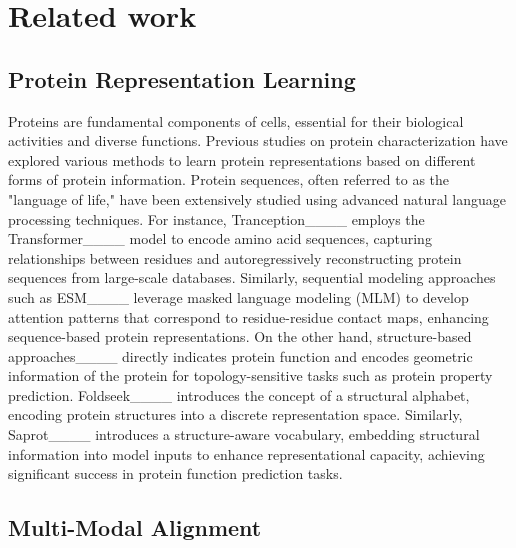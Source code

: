 \section{Related work}
\subsection*{Protein Representation Learning}

Proteins are fundamental components of cells, essential for their biological activities and diverse functions. Previous studies on protein characterization have explored various methods to learn protein representations based on different forms of protein information. Protein sequences, often referred to as the "language of life," have been extensively studied using advanced natural language processing techniques. For instance, Tranception____ employs the Transformer____ model to encode amino acid sequences, capturing relationships between residues and autoregressively reconstructing protein sequences from large-scale databases. Similarly, sequential modeling approaches such as ESM____ leverage masked language modeling (MLM) to develop attention patterns that correspond to residue-residue contact maps, enhancing sequence-based protein representations.
On the other hand, structure-based approaches____ directly indicates protein function and encodes geometric information of the protein for topology-sensitive tasks such as protein property prediction. Foldseek____ introduces the concept of a structural alphabet, encoding protein structures into a discrete representation space. Similarly, Saprot____ introduces a structure-aware vocabulary, embedding structural information into model inputs to enhance representational capacity, achieving significant success in protein function prediction tasks.


\subsection*{Multi-Modal Alignment}



